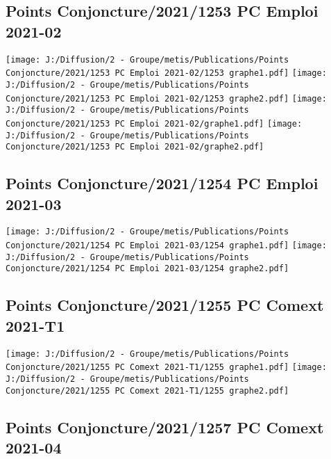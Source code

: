 \documentclass[
]{article}
\begin{document}
\hypertarget{points-conjoncture20211253-pc-emploi-2021-02}{%
\subsection{Points Conjoncture/2021/1253 PC Emploi
2021-02}\label{points-conjoncture20211253-pc-emploi-2021-02}}

\texttt{[image: J:/Diffusion/2 - Groupe/metis/Publications/Points Conjoncture/2021/1253 PC Emploi 2021-02/1253 graphe1.pdf]}
\texttt{[image: J:/Diffusion/2 - Groupe/metis/Publications/Points Conjoncture/2021/1253 PC Emploi 2021-02/1253 graphe2.pdf]}
\texttt{[image: J:/Diffusion/2 - Groupe/metis/Publications/Points Conjoncture/2021/1253 PC Emploi 2021-02/graphe1.pdf]}
\texttt{[image: J:/Diffusion/2 - Groupe/metis/Publications/Points Conjoncture/2021/1253 PC Emploi 2021-02/graphe2.pdf]}

\hypertarget{points-conjoncture20211254-pc-emploi-2021-03}{%
\subsection{Points Conjoncture/2021/1254 PC Emploi
2021-03}\label{points-conjoncture20211254-pc-emploi-2021-03}}

\texttt{[image: J:/Diffusion/2 - Groupe/metis/Publications/Points Conjoncture/2021/1254 PC Emploi 2021-03/1254 graphe1.pdf]}
\texttt{[image: J:/Diffusion/2 - Groupe/metis/Publications/Points Conjoncture/2021/1254 PC Emploi 2021-03/1254 graphe2.pdf]}

\hypertarget{points-conjoncture20211255-pc-comext-2021-t1}{%
\subsection{Points Conjoncture/2021/1255 PC Comext
2021-T1}\label{points-conjoncture20211255-pc-comext-2021-t1}}

\texttt{[image: J:/Diffusion/2 - Groupe/metis/Publications/Points Conjoncture/2021/1255 PC Comext 2021-T1/1255 graphe1.pdf]}
\texttt{[image: J:/Diffusion/2 - Groupe/metis/Publications/Points Conjoncture/2021/1255 PC Comext 2021-T1/1255 graphe2.pdf]}

\hypertarget{points-conjoncture20211257-pc-comext-2021-04}{%
\subsection{Points Conjoncture/2021/1257 PC Comext
2021-04}\label{points-conjoncture20211257-pc-comext-2021-04}}
\end{document}
